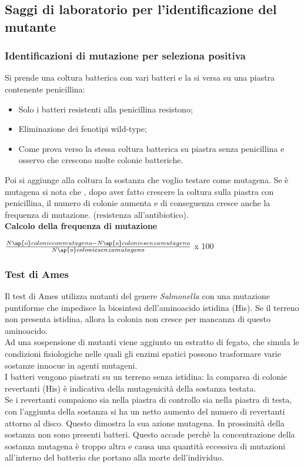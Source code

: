 \subsection{Saggi di laboratorio per l'identificazione del mutante}
\subsubsection{Identificazioni di mutazione per seleziona positiva}
Si prende una coltura batterica con vari batteri e la si versa su una piastra contenente penicillina:
\begin{itemize}
    \item Solo i batteri resistenti alla penicillina resistono; 
    \item Eliminazione dei fenotipi wild-type;
    \item Come prova verso la stessa coltura batterica su piastra senza penicillina e osservo che crescono molte colonie batteriche.
\end{itemize}
Poi si aggiunge alla coltura la sostanza che voglio testare come mutagena. Se è mutagena si nota che , dopo aver fatto crescere la coltura sulla piastra con penicillina, il numero di colonie aumenta e di conseguenza cresce anche la frequenza di mutazione. (resistenza all'antibiotico). 
\\
\textbf{Calcolo della frequenza di mutazione}
\begin{center}
    $\frac{N\ap{o} colonie con mutageno - N\ap{o} colonie senza mutageno}{N\ap{o} colonie senza mutageno}$ x 100
\end{center}
\subsubsection{Test di Ames}
Il test di Ames utilizza mutanti del genere \textit{Salmonella} con una mutazione puntiforme che impedisce la biosintesi dell'aminoacido istidina (His\ap{-}). Se il terreno non presenta istidina, allora la colonia non cresce per mancanza di questo aminoacido. 
\\Ad una sospensione di mutanti viene aggiunto un estratto di fegato, che simula le condizioni fisiologiche nelle quali gli enzimi epatici possono trasformare varie sostanze innocue in agenti mutageni. 
\\I batteri vengono piastrati su un terreno senza istidina: la comparsa di colonie revertanti (His\ap{+}) è indicativa della mutagenicità della sostanza testata.
\\Se i revertanti compaiono sia nella piastra di controllo sia nella piastra di testa, con l'aggiunta della sostanza si ha un netto aumento del numero di revertanti attorno al disco. Questo dimostra la sua azione mutagena. In prossimità della sostanza non sono presenti batteri. Questo accade perchè la concentrazione della sostanza mutagena è troppo altra e causa una quantità eccessiva di mutazioni all'interno del batterio che portano alla morte dell'individuo.
